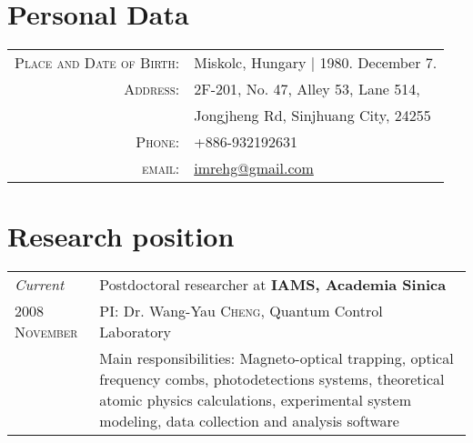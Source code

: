\documentclass[10pt]{article}
\begin{document}
\thispagestyle{empty}
\par{}

\section{Personal Data}

\begin{tabular}{rl}
    \textsc{Place and Date of Birth:} & Miskolc, Hungary | 1980. December 7. \\
    \textsc{Address:}   & 2F-201, No. 47, Alley 53, Lane 514, \\
                        & Jongjheng Rd, Sinjhuang City, 24255 \\
    \textsc{Phone:}     & +886-932192631 \\
    \textsc{email:}     & \href{mailto:imrehg@gmail.com}{imrehg@gmail.com}
\end{tabular}

\section{Research position}
\begin{tabular}{p{3cm}|p{11cm}}
 \emph{Current} & Postdoctoral researcher at \textbf{IAMS, Academia Sinica}\\
\textsc{2008 November}& \small{PI: Dr. Wang-Yau \textsc{Cheng}, Quantum Control Laboratory}\\
&\footnotesize{Main responsibilities: Magneto-optical trapping, optical frequency combs, photodetections systems, theoretical atomic physics calculations, experimental system modeling, data collection and analysis software}
\end{tabular}

\end{document}
